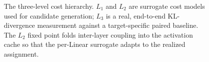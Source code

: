 \begin{figure}[t]
\caption{The three-level cost hierarchy. $L_1$ and $L_2$ are surrogate cost
models used for candidate generation; $L_3$ is a real, end-to-end
KL-divergence measurement against a target-specific paired baseline. The
$L_2$ fixed point folds inter-layer coupling into the activation cache so
that the per-Linear surrogate adapts to the realized assignment.}
\label{fig:cost_hierarchy}
\end{figure}
